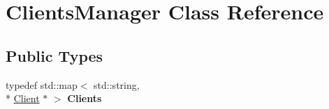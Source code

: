 \hypertarget{class_clients_manager}{\section{Clients\-Manager Class Reference}
\label{class_clients_manager}
}
\subsection*{Public Types}
\begin{DoxyCompactItemize}
\item 
\hypertarget{class_clients_manager_afd5ccb0a4a115f22fc85374df568c74f}{typedef std\-::map$<$ std\-::string, \\*
\hyperlink{class_client}{Client} $\ast$ $>$ {\bfseries Clients}}\label{class_clients_manager_afd5ccb0a4a115f22fc85374df568c74f}

\end{DoxyCompactItemize}
